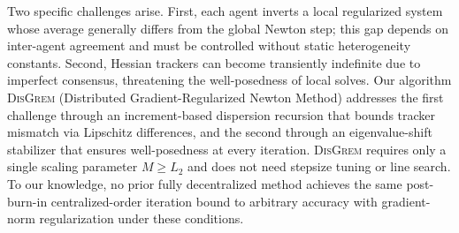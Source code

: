 \documentclass[review,onefignum,onetabnum]{siamart171218}
\begin{document}
	Two specific challenges arise.
	First, each agent inverts a local regularized system whose
	average generally differs from the global Newton step; this gap
	depends on inter-agent agreement and must be controlled without
	static heterogeneity constants.
	Second, Hessian trackers can become transiently indefinite due to
	imperfect consensus, threatening the well-posedness of local solves.
	Our algorithm \textsc{DisGrem} (Distributed Gradient-Regularized
	Newton Method) addresses the first challenge through an increment-based
	dispersion recursion that bounds tracker mismatch via Lipschitz
	differences, and the second through an eigenvalue-shift
	stabilizer that ensures well-posedness at every iteration.
	\textsc{DisGrem} requires only a single scaling parameter $M\ge L_2$
	and does not need stepsize tuning or line search.
	To our knowledge, no prior fully decentralized method achieves the
	same post-burn-in centralized-order iteration bound to arbitrary
	accuracy with gradient-norm regularization under these conditions.
	
\end{document}
